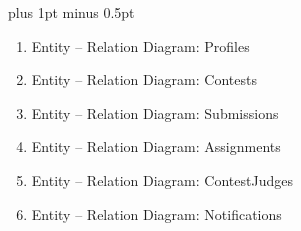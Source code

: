 
\clearpage
\thispagestyle{plain}

\begingroup
\fontsize{16pt}{19.2pt}\selectfont
\justifying
\XeTeXlinebreakskip=0pt plus 1pt minus 0.5pt
\setlength{\parindent}{1.5cm}
\setlength{\parskip}{0pt}

\setlength{\LoneLabelSep}{0.5em}
\settowidth{\LoneLabelWidth}{9.}
\setlength{\LoneContentCol}{\dimexpr 1.5cm + \LoneLabelWidth + \LoneLabelSep\relax}

\setlength{\LtwoLabelSep}{0.5em}
\settowidth{\LtwoLabelWidth}{9.9.}
\setlength{\ExtraAlign}{-2.8em}


\begin{enumerate}
	\item Entity – Relation Diagram: Profiles
	\item Entity – Relation Diagram: Contests
	\item Entity – Relation Diagram: Submissions
	\item Entity – Relation Diagram: Assignments
	\item Entity – Relation Diagram: ContestJudges
	\item Entity – Relation Diagram: Notifications
\end{enumerate}

\vspace{\baselineskip}

\par


\vspace{\baselineskip}

